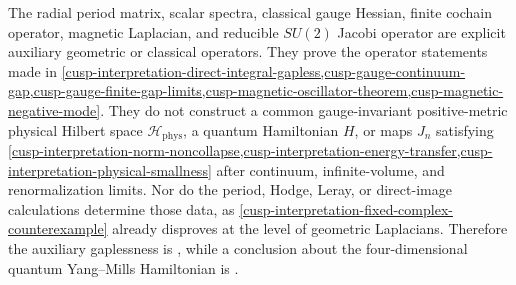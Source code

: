 \begin{auditrecord}
\label{cusp-interpretation-present-boundary}
The radial period matrix, scalar spectra, classical gauge Hessian, finite
cochain operator, magnetic Laplacian, and reducible \(SU(2)\) Jacobi operator
are explicit auxiliary geometric or classical operators.  They prove the
operator statements made in
\cref{cusp-interpretation-direct-integral-gapless,cusp-gauge-continuum-gap,cusp-gauge-finite-gap-limits,cusp-magnetic-oscillator-theorem,cusp-magnetic-negative-mode}.
They do not construct a common gauge-invariant positive-metric physical
Hilbert space \(\mathcal H_{\mathrm{phys}}\), a quantum Hamiltonian \(H\),
or maps \(J_n\) satisfying
\cref{cusp-interpretation-norm-noncollapse,cusp-interpretation-energy-transfer,cusp-interpretation-physical-smallness}
after continuum, infinite-volume, and renormalization limits.  Nor do the
period, Hodge, Leray, or direct-image calculations determine those data, as
\cref{cusp-interpretation-fixed-complex-counterexample} already disproves at
the level of geometric Laplacians.  Therefore the auxiliary gaplessness is
\Verified, while a conclusion about the four-dimensional quantum
Yang--Mills Hamiltonian is \Open.
\end{auditrecord}
